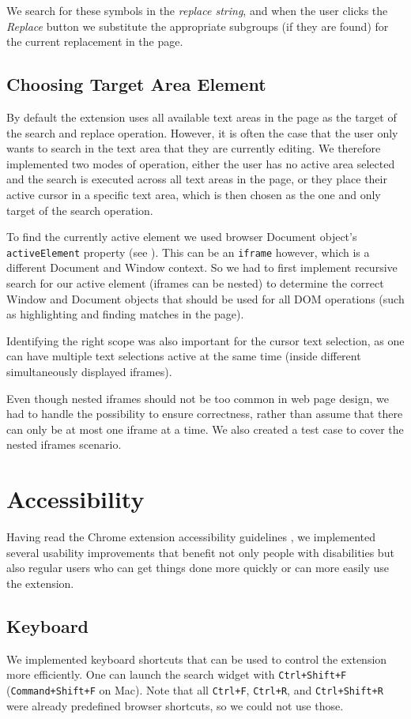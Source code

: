 \documentclass[bsc,frontabs,twoside,singlespacing,parskip,deptreport]{infthesis}
\begin{document}
We search for these symbols in the \textit{replace string}, and when the user clicks the \textit{Replace} button we substitute the appropriate subgroups (if they are found) for the current replacement in the page.

\subsection{Choosing Target Area Element}
By default the extension uses all available text areas in the page as the target of the search and replace operation. However, it is often the case that the user only wants to search in the text area that they are currently editing. We therefore implemented two modes of operation, either the user has no active area selected and the search is executed across all text areas in the page, or they place their active cursor in a specific text area, which is then chosen as the one and only target of the search operation.

To find the currently active element we used browser Document object's \texttt{activeElement} property (see \cite{M10}). This can be an \texttt{iframe} however, which is a different Document and Window context. So we had to first implement recursive search for our active element (iframes can be nested) to determine the correct Window and Document objects that should be used for all DOM operations (such as highlighting and finding matches in the page).

Identifying the right scope was also important for the cursor text selection, as one can have multiple text selections active at the same time (inside different simultaneously displayed iframes).

Even though nested iframes should not be too common in web page design, we had to handle the possibility to ensure correctness, rather than assume that there can only be at most one iframe at a time. We also created a test case to cover the nested iframes scenario.

\section{Accessibility}
Having read the Chrome extension accessibility guidelines \cite{C4}, we implemented several usability improvements that benefit not only people with disabilities but also regular users who can get things done more quickly or can more easily use the extension. 

\subsection{Keyboard}
We implemented keyboard shortcuts that can be used to control the extension more efficiently. One can launch the search widget with \texttt{Ctrl+Shift+F} (\texttt{Command+Shift+F} on
Mac). Note that all \texttt{Ctrl+F}, \texttt{Ctrl+R}, and
\texttt{Ctrl+Shift+R} were already predefined browser shortcuts, so we could not use those.
\end{document}
